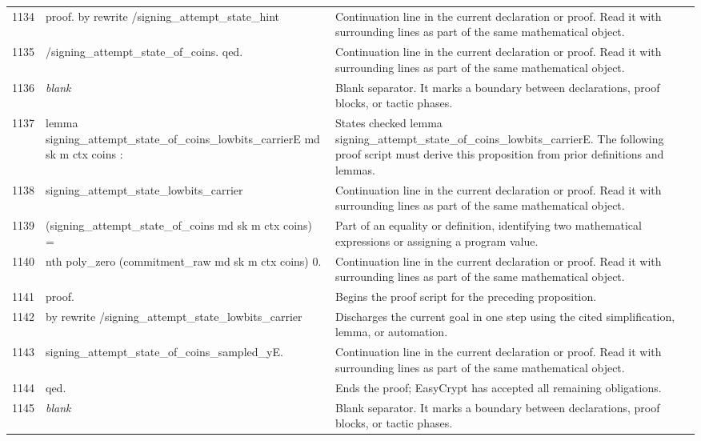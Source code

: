 \documentclass[10pt]{article}
\begin{document}
\begin{longtable}{r L{0.53\textwidth} L{0.37\textwidth}}
1134 & {\ttfamily\scriptsize proof. by rewrite /signing\_attempt\_state\_hint} & Continuation line in the current declaration or proof.  Read it with surrounding lines as part of the same mathematical object. \\
1135 & {\ttfamily\scriptsize                   /signing\_attempt\_state\_of\_coins. qed.} & Continuation line in the current declaration or proof.  Read it with surrounding lines as part of the same mathematical object. \\
1136 & {\ttfamily\scriptsize \emph{blank}} & Blank separator.  It marks a boundary between declarations, proof blocks, or tactic phases. \\
1137 & {\ttfamily\scriptsize lemma signing\_attempt\_state\_of\_coins\_lowbits\_carrierE md sk m ctx coins :} & States checked lemma signing\_attempt\_state\_of\_coins\_lowbits\_carrierE.  The following proof script must derive this proposition from prior definitions and lemmas. \\
1138 & {\ttfamily\scriptsize   signing\_attempt\_state\_lowbits\_carrier} & Continuation line in the current declaration or proof.  Read it with surrounding lines as part of the same mathematical object. \\
1139 & {\ttfamily\scriptsize     (signing\_attempt\_state\_of\_coins md sk m ctx coins) =} & Part of an equality or definition, identifying two mathematical expressions or assigning a program value. \\
1140 & {\ttfamily\scriptsize   nth poly\_zero (commitment\_raw md sk m ctx coins) 0.} & Continuation line in the current declaration or proof.  Read it with surrounding lines as part of the same mathematical object. \\
1141 & {\ttfamily\scriptsize proof.} & Begins the proof script for the preceding proposition. \\
1142 & {\ttfamily\scriptsize by rewrite /signing\_attempt\_state\_lowbits\_carrier} & Discharges the current goal in one step using the cited simplification, lemma, or automation. \\
1143 & {\ttfamily\scriptsize            signing\_attempt\_state\_of\_coins\_sampled\_yE.} & Continuation line in the current declaration or proof.  Read it with surrounding lines as part of the same mathematical object. \\
1144 & {\ttfamily\scriptsize qed.} & Ends the proof; EasyCrypt has accepted all remaining obligations. \\
1145 & {\ttfamily\scriptsize \emph{blank}} & Blank separator.  It marks a boundary between declarations, proof blocks, or tactic phases. \\

\end{longtable}
\end{document}
